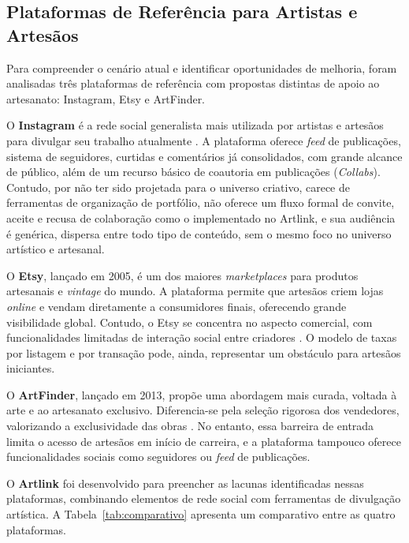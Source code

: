 \documentclass[a4paper, 12pt, oneside]{article}
\begin{document}
\subsection{Plataformas de Referência para Artistas e Artesãos}

Para compreender o cenário atual e identificar oportunidades de melhoria, foram analisadas três plataformas de referência com propostas distintas de apoio ao artesanato: Instagram, Etsy e ArtFinder.

O \textbf{Instagram} é a rede social generalista mais utilizada por artistas e artesãos para divulgar seu trabalho atualmente \cite{instagram2024}. A plataforma oferece \textit{feed} de publicações, sistema de seguidores, curtidas e comentários já consolidados, com grande alcance de público, além de um recurso básico de coautoria em publicações (\textit{Collabs}). Contudo, por não ter sido projetada para o universo criativo, carece de ferramentas de organização de portfólio, não oferece um fluxo formal de convite, aceite e recusa de colaboração como o implementado no Artlink, e sua audiência é genérica, dispersa entre todo tipo de conteúdo, sem o mesmo foco no universo artístico e artesanal.

O \textbf{Etsy}, lançado em 2005, é um dos maiores \textit{marketplaces} para produtos artesanais e \textit{vintage} do mundo. A plataforma permite que artesãos criem lojas \textit{online} e vendam diretamente a consumidores finais, oferecendo grande visibilidade global. Contudo, o Etsy se concentra no aspecto comercial, com funcionalidades limitadas de interação social entre criadores \cite{etsy2024}. O modelo de taxas por listagem e por transação pode, ainda, representar um obstáculo para artesãos iniciantes.

O \textbf{ArtFinder}, lançado em 2013, propõe uma abordagem mais curada, voltada à arte e ao artesanato exclusivo. Diferencia-se pela seleção rigorosa dos vendedores, valorizando a exclusividade das obras \cite{artfinder2024}. No entanto, essa barreira de entrada limita o acesso de artesãos em início de carreira, e a plataforma tampouco oferece funcionalidades sociais como seguidores ou \textit{feed} de publicações.

O \textbf{Artlink} foi desenvolvido para preencher as lacunas identificadas nessas plataformas, combinando elementos de rede social com ferramentas de divulgação artística. A Tabela~\ref{tab:comparativo} apresenta um comparativo entre as quatro plataformas.
\end{document}
